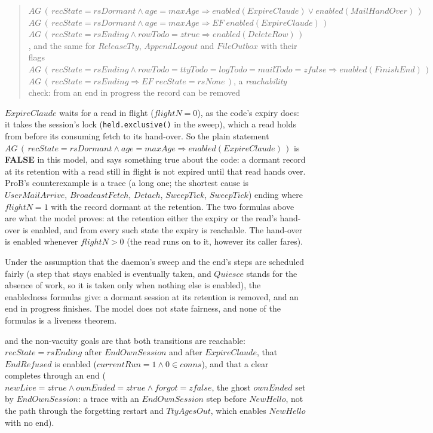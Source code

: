 \documentclass[a4paper,10pt,fleqn]{article}
\begin{document}
\begin{quote}
  $AG\,(\,recState = rsDormant \land age = maxAge \Rightarrow
  enabled(ExpireClaude) \lor enabled(MailHandOver)\,)$ \\
  $AG\,(\,recState = rsDormant \land age = maxAge \Rightarrow
  EF\;enabled(ExpireClaude)\,)$ \\
  $AG\,(\,recState = rsEnding \land rowTodo = ztrue \Rightarrow
  enabled(DeleteRow)\,)$, and the same for $ReleaseTty$, $AppendLogout$ and
  $FileOutbox$ with their flags \\
  $AG\,(\,recState = rsEnding \land rowTodo = ttyTodo = logTodo = mailTodo =
  zfalse \Rightarrow enabled(FinishEnd)\,)$ \\
  $AG\,(\,recState = rsEnding \Rightarrow EF\;recState = rsNone\,)$, a
  \emph{reachability} check: from an end in progress the record can be removed
\end{quote}

$ExpireClaude$ waits for a read in flight ($flightN = 0$), as the code's
expiry does: it takes the session's lock (\texttt{held.exclusive()} in the sweep), which a
read holds from before its consuming fetch to its hand-over.  So the plain statement
$AG\,(\,recState = rsDormant \land age = maxAge \Rightarrow enabled(ExpireClaude)\,)$
is \textbf{FALSE} in this model, and says something true about the code: a dormant
record at its retention with a read still in flight is not expired until that read
hands over.  ProB's counterexample is a trace (a long one; the shortest cause is
$UserMailArrive$, $BroadcastFetch$, $Detach$, $SweepTick$, $SweepTick$) ending where $flightN = 1$ with the record dormant at the retention.
The two formulas above are what the model proves: at the retention either the expiry
or the read's hand-over is enabled, and from every such state the expiry is reachable.
The hand-over is enabled whenever $flightN > 0$ (the read runs on to it, however its caller fares).

Under the assumption that the daemon's sweep and the end's steps are scheduled
fairly (a step that stays enabled is eventually taken, and $Quiesce$ stands for the
absence of work, so it is taken only when nothing else is enabled), the
enabledness formulas give: a dormant session at its retention is removed, and an
end in progress finishes.  The model does not state fairness, and none of the
formulas is a liveness theorem.

and the non-vacuity goals are that both transitions are reachable:
$recState = rsEnding$ after $EndOwnSession$ and after $ExpireClaude$, that
$EndRefused$ is enabled ($currentRun = 1 \land 0 \in conns$), and that a clear
completes through an end ($newLive = ztrue \land ownEnded = ztrue \land forgot =
zfalse$, the ghost $ownEnded$ set by $EndOwnSession$: a trace with an
$EndOwnSession$ step before $NewHello$, not the path through the forgetting restart
and $TtyAgesOut$, which enables $NewHello$ with no end).
\end{document}
